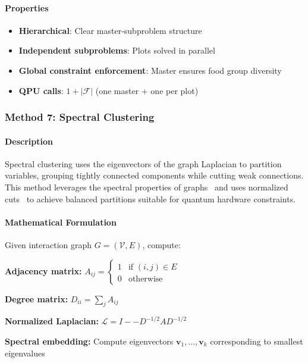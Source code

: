 \documentclass{oqireport}
\begin{document}
\paragraph{Properties}
\begin{itemize}
\item \textbf{Hierarchical}: Clear master-subproblem structure
\item \textbf{Independent subproblems}: Plots solved in parallel
\item \textbf{Global constraint enforcement}: Master ensures food group diversity
\item \textbf{QPU calls}: $1 + |\mathcal{F}|$ (one master + one per plot)
\end{itemize}

\subsubsection{Method 7: Spectral Clustering}

\paragraph{Description}
Spectral clustering uses the eigenvectors of the graph Laplacian to partition variables, grouping tightly connected components while cutting weak connections. This method leverages the spectral properties of graphs~\cite{vonluxburg2007tutorial, ng2001spectral} and uses normalized cuts~\cite{shi2000normalized} to achieve balanced partitions suitable for quantum hardware constraints.

\paragraph{Mathematical Formulation}

Given interaction graph $G = (\mathcal{V}, E)$, compute:

\textbf{Adjacency matrix:} $A_{ij} = \begin{cases} 1 & \text{if } (i,j) \in E \\ 0 & \text{otherwise} \end{cases}$

\textbf{Degree matrix:} $D_{ii} = \sum_j A_{ij}$

\textbf{Normalized Laplacian:} $\mathcal{L} = I -- D^{-1/2} A D^{-1/2}$

\textbf{Spectral embedding:} Compute eigenvectors $\mathbf{v}_1, \ldots, \mathbf{v}_k$ corresponding to smallest eigenvalues
\end{document}
